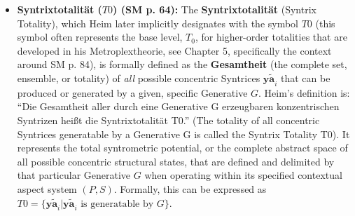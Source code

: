 \documentclass[12pt]{article}
\newcommand{\q}[1]{\enquote{#1}}
\newcommand{\syntrix}{\bm{y\widetilde{a}}}
\newcommand{\aspektivsystem}{P}
\newcommand{\subjektiveraspekt}{S}
\newcommand{\syntrixtotalitaet}{T0}
\newcommand{\generative}{G}
\begin{document}
\begin{itemize}
    \item \textbf{Syntrixtotalität (\( \syntrixtotalitaet \)) (SM p. 64):}
    The \textbf{Syntrixtotalität} (Syntrix Totality), which Heim later implicitly designates with the symbol \( \syntrixtotalitaet \) (this symbol often represents the base level, \(T_0\), for higher-order totalities that are developed in his Metroplextheorie, see Chapter 5, specifically the context around SM p. 84), is formally defined as the \textbf{Gesamtheit} (the complete set, ensemble, or totality) of \textit{all} possible concentric Syntrices \( \syntrix_i \) that can be produced or generated by a given, specific Generative \( \generative \). Heim's definition is: \q{Die Gesamtheit aller durch eine Generative G erzeugbaren konzentrischen Syntrizen heißt die Syntrixtotalität T0.} (The totality of all concentric Syntrices generatable by a Generative G is called the Syntrix Totality T0). It represents the total syntrometric potential, or the complete abstract space of all possible concentric structural states, that are defined and delimited by that particular Generative \( \generative \) when operating within its specified contextual aspect system \((\aspektivsystem,\subjektiveraspekt)\). Formally, this can be expressed as \( \syntrixtotalitaet = \{\syntrix_i | \syntrix_i \text{ is generatable by } \generative \} \).


\end{itemize}
\end{document}

